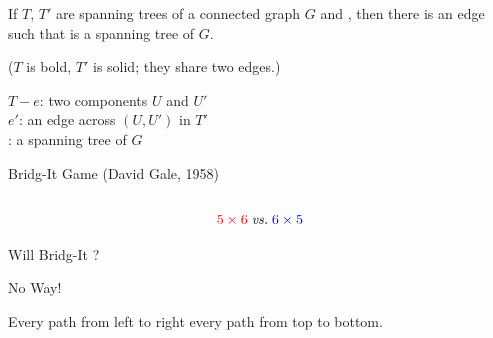 
\begin{frame}{}
	\begin{theorem}
		If $T$, $T'$ are spanning trees of a connected graph $G$
		and ,
		then there is an edge 
		such that  is a spanning tree of $G$.
	\end{theorem}

	\pause
	\vspace{0.30cm}
	\begin{center}
		{\small ($T$ is bold, $T'$ is solid; they share two edges.)}
	\end{center}

	\pause
	\vspace{0.30cm}
	\begin{center}
		$T - e$: two components $U$ and $U'$ \\[8pt]
		\pause
		$e'$: an edge across $(U, U')$ in $T'$ \\[8pt]
		\pause
		: a spanning tree of $G$
	\end{center}
\end{frame}

\begin{frame}
  \begin{exampleblock}{Bridg-It Game (David Gale, 1958) \qquad
    \href{https://mglaezer.github.io/bridgit/}{}}
    \begin{columns}
    \end{columns}

    \[
      \textcolor{red}{5 \times 6} \;\text{\it vs.}\; \textcolor{blue}{6 \times 5}
    \]
  \end{exampleblock}
\end{frame}

\begin{frame}
\end{frame}

\begin{frame}
  \begin{center}
    Will Bridg-It ?

    \pause
    \vspace{0.80cm}
    No Way!

		\vspace{0.30cm}
		Every path from left to right 
		every path from top to bottom.
  \end{center}
\end{frame}

